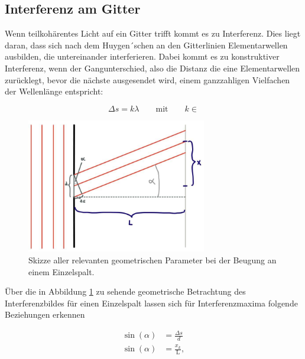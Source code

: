     \subsection{Interferenz am Gitter}
        Wenn teilkohärentes Licht auf ein Gitter trifft kommt es zu Interferenz. Dies liegt daran, dass sich nach dem Huygen´schen an den Gitterlinien Elementarwellen ausbilden, die untereinander interferieren.
        Dabei kommt es zu konstruktiver Interferenz, wenn der Gangunterschied, also die Distanz die eine Elementarwellen zurücklegt, bevor die nächste ausgesendet wird, einem ganzzahligen Vielfachen der 
        Wellenlänge entspricht:

        \begin{equation}
            \Delta s = k \lambda \qquad \text{mit} \qquad k \in \mathds{}
            \label{eqn:gangunterschied}
        \end{equation}

        \begin{figure}[h]
            \centering
            \includegraphics[width = 0.7\textwidth]{pictures/spalt.jpg}
            \caption{Skizze aller relevanten geometrischen Parameter bei der Beugung an einem Einzelspalt.}
            \label{fig:Spalt}
        \end{figure}

        Über die in Abbildung \ref{fig:Spalt} zu sehende geometrische Betrachtung des Interferenzbildes für einen Einzelspalt lassen sich für Interferenzmaxima folgende Beziehungen erkennen

        \begin{align*}
            \sin \left(\alpha\right) &= \frac{\Delta s}{d} \\
            \sin \left(\alpha\right) &= \frac{x_k}{\text{L}} ,
        \end{align*}

